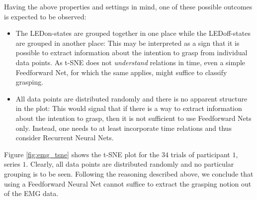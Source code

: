 \documentclass{article} %
\begin{document}
Having the above properties and settings in mind, one of these possible outcomes is expected to be observed:
\begin{itemize}
	\item The LEDon-states are grouped together in one place while the LEDoff-states are grouped in another place:
	This may be interpreted as a sign that it is possible to extract information about the intention to grasp from individual data points. As t-SNE does not \emph{understand} relations in time, even a simple Feedforward Net, for which the same applies, might suffice to classify grasping.
	\item All data points are distributed randomly and there is no apparent structure in the plot:
	This would signal that if there is a way to extract information about the intention to grasp, then it is not sufficient to use Feedforward Nets only. Instead, one needs to at least incorporate time relations and thus consider Recurrent Neural Nets.
\end{itemize}
Figure \ref{fig:emg_tsne} shows the t-SNE plot for the $34$ trials of participant $1$, series $1$. Clearly, all data points are distributed randomly and no particular grouping is to be seen. Following the reasoning described above, we conclude that using a Feedforward Neural Net cannot suffice to extract the grasping notion out of the EMG data.
\end{document}
